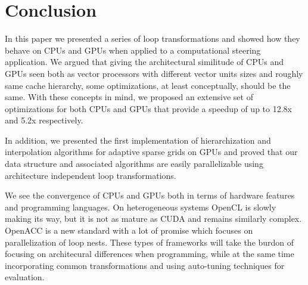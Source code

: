 \section{Conclusion}

In this paper we presented a series of loop transformations and showed
how they behave on CPUs and GPUs when applied to a computational steering
application. We argued that giving the architectural similitude of CPUs and GPUs
seen both as vector processors with different vector units sizes and roughly
same cache hierarchy, some optimizations, at least conceptually, should be the
same. With these concepts in mind, we proposed an extensive set of optimizations
for both CPUs and GPUs that provide a speedup of up to 12.8x and 5.2x
respectively.

In addition, we presented the first implementation of hierarchization and
interpolation algorithms for adaptive sparse grids on GPUs and proved that our
data structure and associated algorithms are easily parallelizable using
architecture independent loop transformations.

We see the convergence of CPUs and GPUs both in terms of hardware features and
programming languages. On heterogeneous systems OpenCL \cite{opencl} is slowly
making its way, but it is not as mature as CUDA and remains similarly complex.
OpenACC \cite{openacc} is a new standard with a lot of promise which focuses on
parallelization of loop nests. These types of frameworks will take the burdon
of focusing on architecural differences when programming, while at the same time
incorporating common transformations and using auto-tuning techniques for evaluation.
